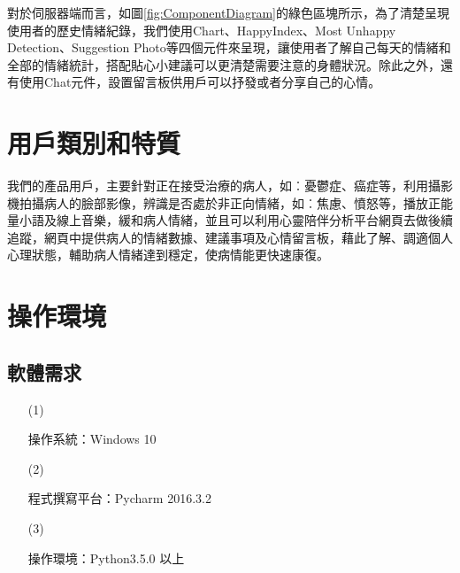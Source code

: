 \documentclass[12pt]{scrreprt}
\begin{document}
對於伺服器端而言，如圖\ref{fig:ComponentDiagram}的綠色區塊所示，為了清楚呈現使用者的歷史情緒紀錄，我們使用Chart、HappyIndex、Most Unhappy Detection、Suggestion Photo等四個元件來呈現，讓使用者了解自己每天的情緒和全部的情緒統計，搭配貼心小建議可以更清楚需要注意的身體狀況。除此之外，還有使用Chat元件，設置留言板供用戶可以抒發或者分享自己的心情。



\section{用戶類別和特質}
我們的產品用戶，主要針對正在接受治療的病人，如︰憂鬱症、癌症等，利用攝影機拍攝病人的臉部影像，辨識是否處於非正向情緒，如︰焦慮、憤怒等，播放正能量小語及線上音樂，緩和病人情緒，並且可以利用心靈陪伴分析平台網頁去做後續追蹤，網頁中提供病人的情緒數據、建議事項及心情留言板，藉此了解、調適個人心理狀態，輔助病人情緒達到穩定，使病情能更快速康復。

\section{操作環境}

\subsection{軟體需求}
\begin{itemize}
\item[(1)]{\begin{bfseries}{操作系統：}Windows 10\end{bfseries}}
\item[(2)]{\begin{bfseries}{程式撰寫平台：}Pycharm 2016.3.2\end{bfseries}}
\item[(3)]{\begin{bfseries}{操作環境：}Python3.5.0 以上\end{bfseries}}
\end{itemize}
\end{document}

